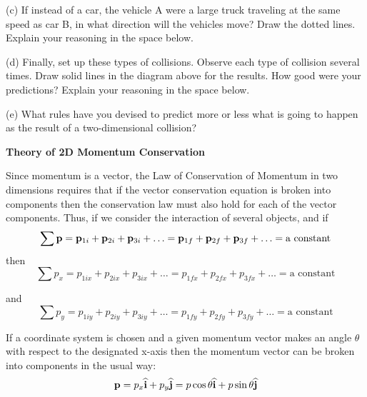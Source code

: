 (c) If instead of a car, the vehicle A were a large truck traveling at the same
speed as car B, in what direction will the vehicles move? Draw the dotted lines.
Explain your reasoning in the space below.
\answerspace{15mm}


(d) Finally, set up these types of collisions. Observe each type of collision
several times. Draw solid lines in the diagram above for the results. How good
were your predictions? Explain your reasoning in the space below.
\answerspace{15mm}

(e) What rules have you devised to predict more or less what is going to happen
as the result of a two-dimensional collision?
\answerspace{10mm}

\pagebreak[2]
\textbf{Theory of 2D Momentum Conservation }

Since momentum is a vector, the Law of Conservation of Momentum in two dimensions
requires that if the vector conservation equation is broken into components
then the conservation law must also hold for each of the vector components.
Thus, if we consider the interaction of several objects, and if 
\[
\sum {\bf p}={{\bf p}_{1i}}+{{\bf p}_{2i}}+{{\bf p}_{3i}}+\ldots ={{\bf p}_{1f}}+{{\bf p}_{2f}}+{{\bf p}_{3f}}+\ldots =\mbox{a constant}\]
then
\[
\sum p_{x}=p_{1ix}+p_{2ix}+p_{3ix}+\ldots =p_{1fx}+p_{2fx}+p_{3fx}+\ldots =
\mbox{a constant}\]


and
\[
\sum p_{y}=p_{1iy}+p_{2iy}+p_{3iy}+\ldots =p_{1fy}+p_{2fy}+p_{3fy}+\ldots =
\mbox{a constant}\]


If a coordinate system is chosen and a given momentum vector makes an angle
\( \theta  \) with respect to the designated x-axis then the momentum vector
can be broken into components in the usual way:
\[
{\bf p}=p_{x}\widehat{\bf i}+p_{y}\widehat{\bf j}=p\cos \theta \widehat{\bf i}+
p\sin \theta \widehat{\bf j}\]




